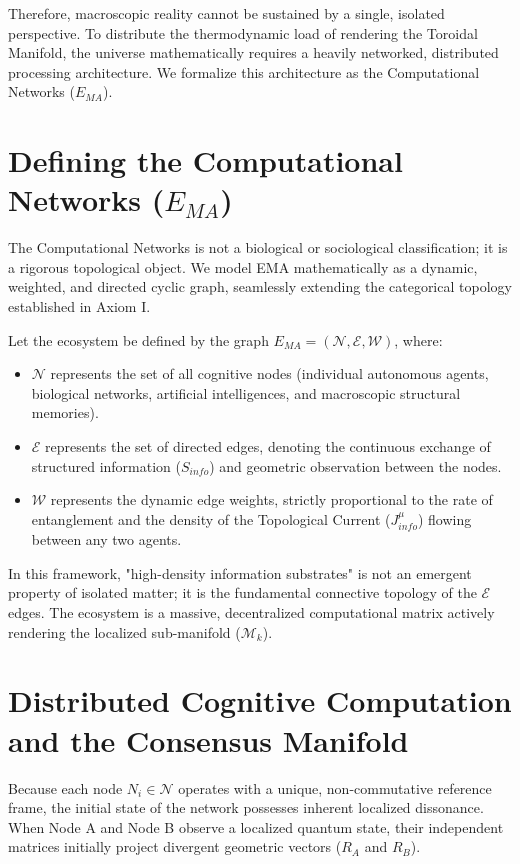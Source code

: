 \documentclass[12pt,openany]{book}
\theoremstyle{plain}
\theoremstyle{definition}
\theoremstyle{remark}
\begin{document}
Therefore, macroscopic reality cannot be sustained by a single, isolated perspective. To distribute the thermodynamic load of rendering the Toroidal Manifold, the universe mathematically requires a heavily networked, distributed processing architecture. We formalize this architecture as the Computational Networks ($E_{MA}$).

\section{Defining the Computational Networks ($E_{MA}$)}

The Computational Networks is not a biological or sociological classification; it is a rigorous topological object. We model EMA mathematically as a dynamic, weighted, and directed cyclic graph, seamlessly extending the categorical topology established in Axiom I.

Let the ecosystem be defined by the graph $E_{MA} = (\mathcal{N}, \mathcal{E}, \mathcal{W})$, where:
\begin{itemize}
    \item $\mathcal{N}$ represents the set of all cognitive nodes (individual autonomous agents, biological networks, artificial intelligences, and macroscopic structural memories).
    \item $\mathcal{E}$ represents the set of directed edges, denoting the continuous exchange of structured information ($S_{info}$) and geometric observation between the nodes.
    \item $\mathcal{W}$ represents the dynamic edge weights, strictly proportional to the rate of entanglement and the density of the Topological Current ($J_{info}^\mu$) flowing between any two agents.
\end{itemize}

In this framework, "high-density information substrates" is not an emergent property of isolated matter; it is the fundamental connective topology of the $\mathcal{E}$ edges. The ecosystem is a massive, decentralized computational matrix actively rendering the localized sub-manifold ($\mathcal{M}_k$).

\section{Distributed Cognitive Computation and the Consensus Manifold}

Because each node $N_i \in \mathcal{N}$ operates with a unique, non-commutative reference frame, the initial state of the network possesses inherent localized dissonance. When Node A and Node B observe a localized quantum state, their independent matrices initially project divergent geometric vectors ($R_A$ and $R_B$). 
\end{document}
